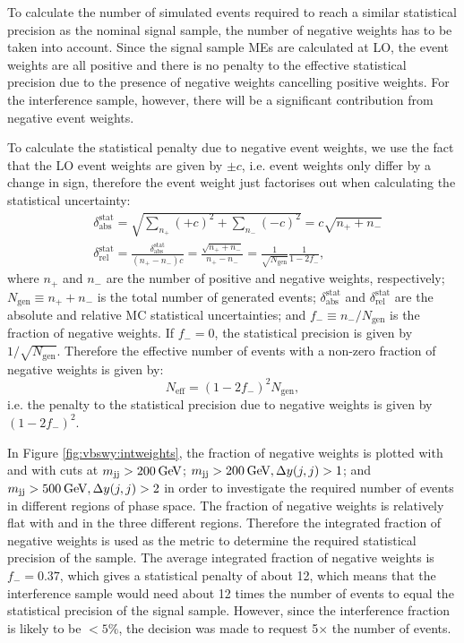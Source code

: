 To calculate the number of simulated events required to reach a similar statistical precision as the nominal \ewwy signal sample, the number of negative weights has to be taken into account. Since the signal sample MEs are calculated at LO, the event weights are all positive and there is no penalty to the effective statistical precision due to the presence of negative weights cancelling positive weights. For the interference sample, however, there will be a significant contribution from negative event weights.

To calculate the statistical penalty due to negative event weights, we use the fact that the LO event weights are given by $\pm c$, i.e. event weights only differ by a change in sign, therefore the event weight just factorises out when calculating the statistical uncertainty:
\begin{equation}\label{eq:negweights}
  \begin{split}
  &\delta_{\text{abs}}^{\text{stat}} = \sqrt{\sum_{n_+}(+c)^2 + \sum_{n_-}(-c)^2}=c\sqrt{n_++n_-} \\
  &\delta_{\text{rel}}^{\text{stat}} = \frac{\delta_{\text{abs}}^{\text{stat}}}{(n_+-n_-)c} = \frac{\sqrt{n_++n_-}}{n_+-n_-} = \frac{1}{\sqrt{N_{\text{gen}}}}\frac{1}{1-2f_-},
  \end{split}
\end{equation} 
where $n_+$ and $n_-$ are the number of positive and negative weights, respectively; $N_{\text{gen}}\equiv n_++n_-$ is the total number of generated events; $\delta_{\text{abs}}^{\text{stat}}$ and $\delta_{\text{rel}}^{\text{stat}}$ are the absolute and relative MC statistical uncertainties; and $f_-\equiv n_-/N_\text{gen}$ is the fraction of negative weights. If $f_-=0$, the statistical precision is given by $1/\sqrt{N_{\text{gen}}}$. Therefore the effective number of events with a non-zero fraction of negative weights is given by:
\begin{equation}
  N_{\text{eff}}=(1-2f_-)^2N_{\text{gen}},
\end{equation}
i.e. the penalty to the statistical precision due to negative weights is given by $(1-2f_-)^2$.

In Figure \ref{fig:vbswy:intweights}, the fraction of negative weights is plotted with \mjj and \dyjj with cuts at $m_{\text{jj}}>200\hspace{2pt}\text{Ge\kern -0.1em V}$; $m_{\text{jj}}>200\hspace{2pt}\text{Ge\kern -0.1em V}, \Delta y(j,j)>1$; and $m_{\text{jj}}>500\hspace{2pt}\text{Ge\kern -0.1em V}, \Delta y(j,j)>2$ in order to investigate the required number of events in different regions of phase space. The fraction of negative weights is relatively flat with \mjj and \dyjj in the three different regions. Therefore the integrated fraction of negative weights is used as the metric to determine the required statistical precision of the sample. The average integrated fraction of negative weights is $f_-=0.37$, which gives a statistical penalty of about 12, which means that the interference sample would need about 12 times the number of events to equal the statistical precision of the \MADGRAPH \ewwy signal sample. However, since the interference fraction is likely to be $<5\%$, the decision was made to request 5$\times$ the number of events.%

